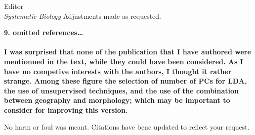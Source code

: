 \documentclass{letter}
\begin{document}
\begin{letter}{Editor \\ \textit{Systematic Biology}}
  Adjustments made as requested.

  \textbf{9. omitted references\ldots \\\\
  I was surprised that none of the publication that I have authored were mentionned in the text, while they could have been considered. As I have no competive interests with the authors, I thought it rather strange. Among these figure the selection of number of PCs for LDA, the use of unsupervised techniques, and the use of the combination between geography and morphology; which may be important to consider for improving this version. }

  No harm or foul was meant. Citations have bene updated to reflect your request.


\end{letter}


\end{document}
